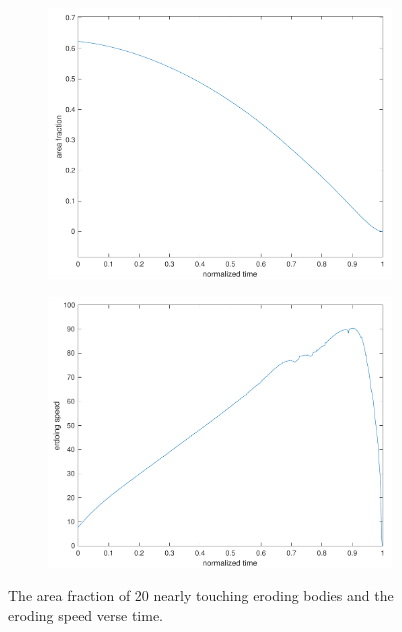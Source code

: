 \documentclass[preprint, 10pt]{elsarticle}
\begin{document}
\begin{figure}[H]
\begin{subfigure}[b]{0.5\textwidth}
\includegraphics*[width =\linewidth]{./figs/porosity20dense}
\caption{}
\end{subfigure}%
\begin{subfigure}[b]{0.5\textwidth}
\includegraphics*[width =\linewidth]{./figs/erodingspeed20dense}
\caption{}
\end{subfigure}
\caption{\label{fig:Eroding20area}  The area fraction of 20 nearly
  touching eroding bodies and the eroding speed verse time. }
\end{figure}
\end{document}
